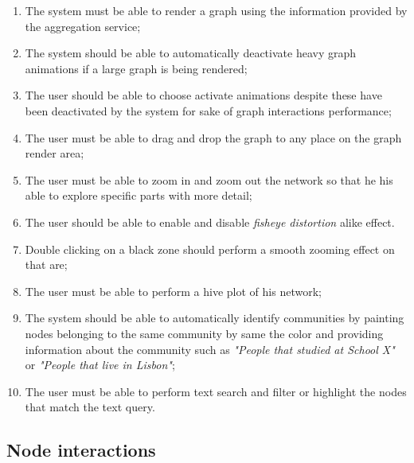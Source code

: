 \begin{enumerate}
    \item The system must be able to render a graph using the information provided by the aggregation service;
    \item The system should be able to automatically deactivate heavy graph animations if a large graph is being rendered;
    \item The user should be able to choose activate animations despite these have been deactivated by the system for sake of graph interactions performance;
    \item The user must be able to drag and drop the graph to any place on the graph render area;
    \item The user must be able to zoom in and zoom out the network so that he his able to explore specific parts with more detail;
    \item The user should be able to enable and disable \textit{fisheye distortion} alike effect. %
    \item Double clicking on a black zone should perform a smooth zooming effect on that are; %
    \item The user must be able to perform a hive plot of his network;
    \item The system should be able to automatically identify communities by painting nodes belonging to the same community by same the color and providing
    information about the community such as \textit{"People that studied at School X"} or \textit{"People that live in Lisbon"};
    \item The user must be able to perform text search and filter or highlight the nodes that match the text query.
\end{enumerate}

\subsection{Node interactions}

